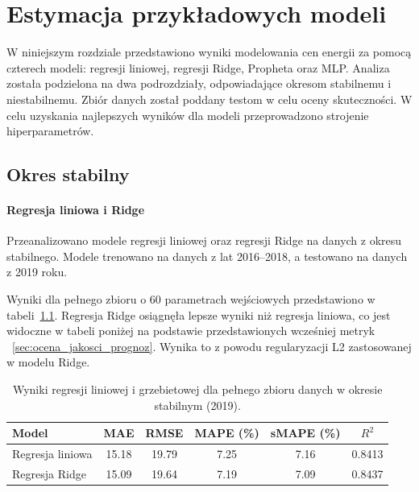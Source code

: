 \chapter{Estymacja przykładowych modeli}
\label{ch:analiza}

W niniejszym rozdziale przedstawiono wyniki modelowania cen energii za pomocą czterech modeli: regresji liniowej, regresji Ridge, Propheta oraz MLP. Analiza została podzielona na dwa podrozdziały, odpowiadające okresom stabilnemu i niestabilnemu. Zbiór danych został poddany testom w celu oceny skuteczności. W celu uzyskania najlepszych wyników dla modeli przeprowadzono strojenie hiperparametrów.

\section{Okres stabilny}
\label{sec:okres_stabilny}

\subsubsection{Regresja liniowa i Ridge}

Przeanalizowano modele regresji liniowej oraz regresji Ridge na danych z okresu stabilnego. Modele trenowano na danych z lat 2016--2018, a testowano na danych z 2019 roku.

Wyniki dla pełnego zbioru o 60 parametrach wejściowych przedstawiono w tabeli~\ref{tab:linear_ridge_results_full}. Regresja Ridge osiągnęła lepsze wyniki niż regresja liniowa, co jest widoczne w tabeli poniżej na podstawie przedstawionych wcześniej metryk ~\ref{sec:ocena_jakosci_prognoz}. Wynika to z powodu regularyzacji L2 zastosowanej w modelu Ridge. 

\begin{table}[H]
    \centering
    \caption{Wyniki regresji liniowej i grzebietowej dla pełnego zbioru danych w okresie stabilnym (2019).}
    \label{tab:linear_ridge_results_full}
    \begin{tabular}{|l|ccccc|}
        \hline
        \textbf{Model} & \textbf{MAE} & \textbf{RMSE} & \textbf{MAPE (\%)} & \textbf{sMAPE (\%)} & \textbf{\(R^2\)} \\
        \hline
        Regresja liniowa & 15.18 & 19.79 & 7.25 & 7.16 & 0.8413 \\
        Regresja Ridge   & 15.09 & 19.64 & 7.19 & 7.09 & 0.8437 \\
        \hline
    \end{tabular}
\end{table}


